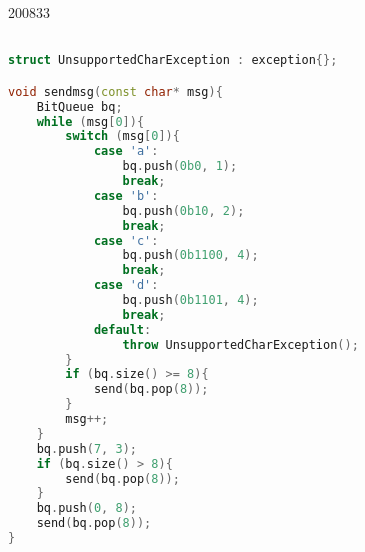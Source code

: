\documentclass[10pt,\jkfside,a4paper]{article}
\begin{document}
\begin{examquestion}{2008}{3}{3}
\begin{enumerate}[label=(\alph*)]
\begin{lstlisting}[language=C++]

struct UnsupportedCharException : exception{};

void sendmsg(const char* msg){
    BitQueue bq;
    while (msg[0]){
        switch (msg[0]){
            case 'a':
                bq.push(0b0, 1);
                break;
            case 'b':
                bq.push(0b10, 2);
                break;
            case 'c':
                bq.push(0b1100, 4);
                break;
            case 'd':
                bq.push(0b1101, 4);
                break;
            default:
                throw UnsupportedCharException();
        }
        if (bq.size() >= 8){
            send(bq.pop(8));
        }
        msg++;
    }
    bq.push(7, 3);
    if (bq.size() > 8){
        send(bq.pop(8));
    }
    bq.push(0, 8);
    send(bq.pop(8));
}

\end{lstlisting}

\end{enumerate}

\end{examquestion}
\end{document}
